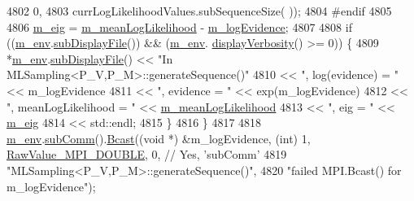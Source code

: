 \begin{DoxyCode}
{{{{4802                                                                    0,
4803                                                                    currLogLikelihoodValues.subSequenceSize(
      ));
4804 \textcolor{preprocessor}{#endif}
4805 \textcolor{preprocessor}{}
4806     \hyperlink{class_q_u_e_s_o_1_1_m_l_sampling_abec7f8cf9da08bc5c0a20d99fa4570af}{m\_eig} = \hyperlink{class_q_u_e_s_o_1_1_m_l_sampling_aec4229773274b58e3eaa49a77738389f}{m\_meanLogLikelihood} - \hyperlink{class_q_u_e_s_o_1_1_m_l_sampling_afad63c42dccb1518319bf677f2bffde0}{m\_logEvidence};
4807 
4808     \textcolor{keywordflow}{if} ((\hyperlink{class_q_u_e_s_o_1_1_m_l_sampling_a13f1ca4fe9f94822fe572a743eaced1d}{m\_env}.\hyperlink{class_q_u_e_s_o_1_1_base_environment_a8a0064746ae8dddfece4229b9ad374d6}{subDisplayFile}()) && (\hyperlink{class_q_u_e_s_o_1_1_m_l_sampling_a13f1ca4fe9f94822fe572a743eaced1d}{m\_env}.
      \hyperlink{class_q_u_e_s_o_1_1_base_environment_a1fe5f244fc0316a0ab3e37463f108b96}{displayVerbosity}() >= 0)) \{
4809       *\hyperlink{class_q_u_e_s_o_1_1_m_l_sampling_a13f1ca4fe9f94822fe572a743eaced1d}{m\_env}.\hyperlink{class_q_u_e_s_o_1_1_base_environment_a8a0064746ae8dddfece4229b9ad374d6}{subDisplayFile}() << \textcolor{stringliteral}{"In MLSampling<P\_V,P\_M>::generateSequence()"}
4810                               << \textcolor{stringliteral}{", log(evidence) = "}     << m\_logEvidence
4811                               << \textcolor{stringliteral}{", evidence = "}          << exp(m\_logEvidence)
4812                               << \textcolor{stringliteral}{", meanLogLikelihood = "} << \hyperlink{class_q_u_e_s_o_1_1_m_l_sampling_aec4229773274b58e3eaa49a77738389f}{m\_meanLogLikelihood}
4813                               << \textcolor{stringliteral}{", eig = "}               << \hyperlink{class_q_u_e_s_o_1_1_m_l_sampling_abec7f8cf9da08bc5c0a20d99fa4570af}{m\_eig}
4814                               << std::endl;
4815     \}
4816   \}
4817 
4818   \hyperlink{class_q_u_e_s_o_1_1_m_l_sampling_a13f1ca4fe9f94822fe572a743eaced1d}{m\_env}.\hyperlink{class_q_u_e_s_o_1_1_base_environment_affe39f53e3d5d678842413370af09145}{subComm}().\hyperlink{class_q_u_e_s_o_1_1_mpi_comm_abd6af8db8b0c7fd2f5b62e26477a9537}{Bcast}((\textcolor{keywordtype}{void} *) &m\_logEvidence, (\textcolor{keywordtype}{int}) 1, 
      \hyperlink{_mpi_comm_8h_ad0f503bd9fecfe4e570ca3d15aaf2518}{RawValue\_MPI\_DOUBLE}, 0, \textcolor{comment}{// Yes, 'subComm'}
4819                         \textcolor{stringliteral}{"MLSampling<P\_V,P\_M>::generateSequence()"},
4820                         \textcolor{stringliteral}{"failed MPI.Bcast() for m\_logEvidence"});
}}}}
\end{DoxyCode}
